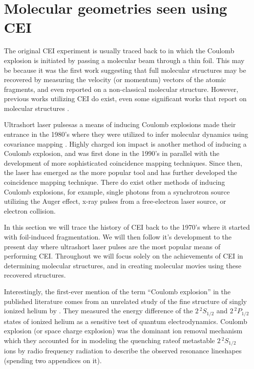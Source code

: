 \section{Molecular geometries seen using CEI}
The original CEI experiment is usually traced back to \citet{Vager89} in which the Coulomb explosion is initiated by passing a molecular beam through a thin foil. This may be because it was the first work suggesting that full molecular structures may be recovered by measuring the velocity (or momentum) vectors of the atomic fragments, and even reported on a non-classical molecular structure. However, previous works utilizing CEI do exist, even some significant works that report on molecular structures \citep{Kanter79}.

Ultrashort laser pulses\footnotemark as a means of inducing Coulomb explosions made their entrance in the 1980's where they were utilized to infer molecular dynamics using covariance mapping \citep{Frasinski89}. Highly charged ion impact is another method of inducing a Coulomb explosion, and was first done in the 1990's in parallel with the development of more sophisticated coincidence mapping techniques. Since then, the laser has emerged as the more popular tool and has further developed the coincidence mapping technique. There do exist other methods of inducing Coulomb explosions, for example, single photons from a synchrotron source utilizing the Auger effect, x-ray pulses from a free-electron laser source, or electron collision.


In this section we will trace the history of CEI back to the 1970's where it started with foil-induced fragmentation. We will then follow it's development to the present day where ultrashort laser pulses are the most popular means of performing CEI. Throughout we will focus solely on the achievements of CEI in determining molecular structures, and in creating molecular movies using these recovered structures.\footnotemark


Interestingly, the first-ever mention of the term ``Coulomb explosion'' in the published literature comes from an unrelated study of the fine structure of singly ionized helium by \citet{Novick55}. They measured the energy difference of the $2 \, ^2 S_{1/2}$ and $2 \, ^2 P_{1/2}$ states of ionized helium as a sensitive test of quantum electrodynamics. Coulomb explosion (or space charge explosion) was the dominant ion removal mechanism which they accounted for in modeling the quenching rate\footnotemark of metastable $2 \, ^2 S_{1/2}$ ions by radio frequency radiation to describe the observed resonance lineshapes (spending two appendices on it).

